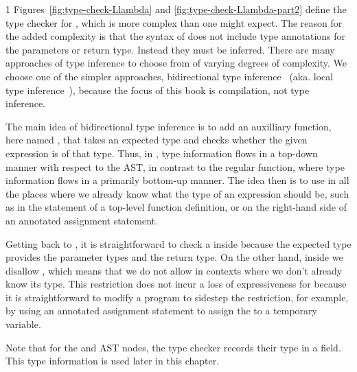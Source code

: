 \documentclass[7x10,nocrop]{TimesAPriori_MIT}%
\def\pythonEd{1}
\def\edition{1}
\begin{document}
{\if\edition\pythonEd
%
Figures~\ref{fig:type-check-Llambda} and
\ref{fig:type-check-Llambda-part2} define the type checker for
\LangLam{}, which is more complex than one might expect. The reason
for the added complexity is that the syntax of  does not
include type annotations for the parameters or return type.  Instead
they must be inferred. There are many approaches of type inference to
choose from of varying degrees of complexity. We choose one of the
simpler approaches, bidirectional type inference~\citep{Dunfield:2021}
(aka. local type inference~\citep{Pierce:2000}), because the focus of
this book is compilation, not type inference.

The main idea of bidirectional type inference is to add an auxilliary
function, here named , that takes an expected type
and checks whether the given expression is of that type.  Thus, in
, type information flows in a top-down manner with
respect to the AST, in contrast to the regular 
function, where type information flows in a primarily bottom-up
manner.
%
The idea then is to use  in all the places where we
already know what the type of an expression should be, such as in the
 statement of a top-level function definition, or on the
right-hand side of an annotated assignment statement.

Getting back to , it is straightforward to check a
 inside  because the expected type
provides the parameter types and the return type.  On the other hand,
inside  we disallow , which means
that we do not allow  in contexts where we don't already
know its type. This restriction does not incur a loss of
expressiveness for \LangLam{} because it is straightforward to modify
a program to sidestep the restriction, for example, by using an
annotated assignment statement to assign the  to a
temporary variable.

Note that for the  and  AST nodes, the type
checker records their type in a  field. This type
information is used later in this chapter.
%
\fi}
\end{document}
